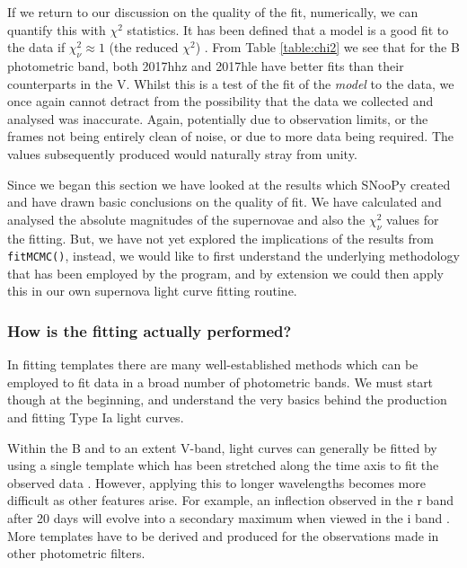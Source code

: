 \documentclass[twocolumn]{revtex4}
\begin{document}
If we return to our discussion on the quality of the fit, numerically, we can quantify this with $\chi^2$ statistics. It has been defined that a model is a good fit to the data if $\chi^2_{\nu} \approx 1$ (the reduced $\chi^2$) \cite{hugheshase}. From Table \ref{table:chi2} we see that for the B photometric band, both 2017hhz and 2017hle have better fits than their counterparts in the V. Whilst this is a test of the fit of the \textit{model} to the data, we once again cannot detract from the possibility that the data we collected and analysed was inaccurate. Again, potentially due to observation limits, or the frames not being entirely clean of noise, or due to more data being required. The values subsequently produced would naturally stray from unity. 

Since we began this section we have looked at the results which SNooPy created and have drawn basic conclusions on the quality of fit. We have calculated and analysed the absolute magnitudes of the supernovae and also the $\chi^2_{\nu}$ values for the fitting. But, we have not yet explored the implications of the results from \texttt{fitMCMC()}, instead, we would like to first understand the underlying methodology that has been employed by the program, and by extension we could then apply this in our own supernova light curve fitting routine. 

\vspace{-3ex}
\subsubsection{How is the fitting actually performed?}
\vspace{-2ex}

In fitting templates there are many well-established methods which can be employed to fit data in a broad number of photometric bands. We must start though at the beginning, and understand the very basics behind the production and fitting Type Ia light curves.

Within the B and to an extent V-band, light curves can generally be fitted by using a single template which has been stretched along the time axis to fit the observed data \cite{highred_perl}. However, applying this to longer wavelengths becomes more difficult as other features arise. For example, an inflection observed in the r band after 20 days will evolve into a secondary maximum when viewed in the i band \cite{car_snoopy}. More templates have to be derived and produced for the observations made in other photometric filters.
\end{document}
